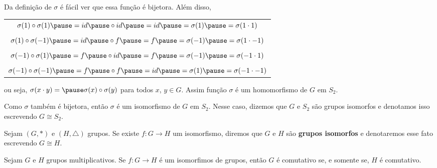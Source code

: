 \documentclass{beamer}
\begin{document}
    \begin{frame}
        Da defini\c{c}\~ao de $\sigma$ \pause \'e f\'acil ver que essa fun\c{c}\~ao \'e bijetora. \pause Al\'em disso, \pause
        \begin{center}
            \begin{tabular}{c}
                $\sigma(1) \circ \sigma(1) \pause = id \pause \circ id \pause = id \pause = \sigma(1) \pause = \sigma(1 \cdot 1)$\pause\\
                \\
                $\sigma(1) \circ \sigma(-1) \pause = id \pause \circ f \pause = f \pause = \sigma(-1) \pause = \sigma(1 \cdot -1)$ \pause\\
                \\
                $\sigma(-1) \circ \sigma(1) \pause = f \pause \circ id \pause = f \pause = \sigma(-1) \pause = \sigma(-1 \cdot 1)$ \pause\\
                \\
                $\sigma(-1) \circ \sigma(-1) \pause = f \pause \circ f \pause = id \pause = \sigma(1) \pause = \sigma(-1 \cdot -1)$ \pause\\
            \end{tabular}
        \end{center}
        ou seja, $\sigma(x\cdot y) = \pause \sigma(x) \circ \sigma(y)$ \pause para todos $x$, $y \in G$. \pause Assim fun\c{c}\~ao $\sigma$ \'e um homomorfismo de $G$ em $S_2$. \pause

        \vspace{.3cm}

        Como $\sigma$ tamb\'em \'e bijetora, \pause ent\~ao $\sigma$ \'e um isomorfismo \pause de $G$ em $S_2$. \pause Nesse caso, dizemos que $G$ e $S_2$ s\~ao grupos isomorfos \pause e denotamos isso escrevendo $G \cong S_2$.
    \end{frame}

    \begin{frame}
        \begin{definicao}
            Sejam $(G, *)$ e $(H, \triangle)$ grupos. \pause Se existe $f : G \to H$ um isomorfismo, \pause diremos que $G$ e $H$ s\~ao \textbf{grupos isomorfos} \pause e denotaremos esse fato escrevendo $G \cong H$. \pause
        \end{definicao}
    \end{frame}

    \begin{frame}
        \begin{proposicao}
            Sejam $G$ e $H$ grupos multiplicativos. \pause Se $f : G \to H$ \'e um isomorfimos de grupos, ent\~ao \pause $G$ \'e comutativo se, e somente se, $H$ \'e comutativo. \pause
        \end{proposicao}
    \end{frame}
\end{document}
